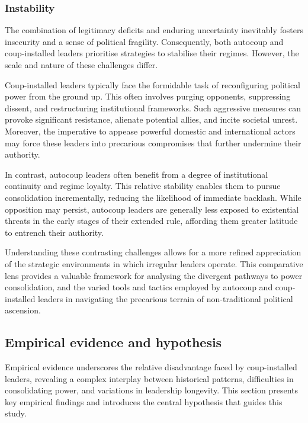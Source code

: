 \documentclass[
  12pt,
]{report}
\begin{document}
\subsubsection*{Instability}\label{instability}

The combination of legitimacy deficits and enduring uncertainty
inevitably fosters insecurity and a sense of political fragility.
Consequently, both autocoup and coup-installed leaders prioritise
strategies to stabilise their regimes. However, the scale and nature of
these challenges differ.

Coup-installed leaders typically face the formidable task of
reconfiguring political power from the ground up. This often involves
purging opponents, suppressing dissent, and restructuring institutional
frameworks. Such aggressive measures can provoke significant resistance,
alienate potential allies, and incite societal unrest. Moreover, the
imperative to appease powerful domestic and international actors may
force these leaders into precarious compromises that further undermine
their authority.

In contrast, autocoup leaders often benefit from a degree of
institutional continuity and regime loyalty. This relative stability
enables them to pursue consolidation incrementally, reducing the
likelihood of immediate backlash. While opposition may persist, autocoup
leaders are generally less exposed to existential threats in the early
stages of their extended rule, affording them greater latitude to
entrench their authority.

Understanding these contrasting challenges allows for a more refined
appreciation of the strategic environments in which irregular leaders
operate. This comparative lens provides a valuable framework for
analysing the divergent pathways to power consolidation, and the varied
tools and tactics employed by autocoup and coup-installed leaders in
navigating the precarious terrain of non-traditional political
ascension.

\subsection*{Empirical evidence and
hypothesis}\label{empirical-evidence-and-hypothesis}

Empirical evidence underscores the relative disadvantage faced by
coup-installed leaders, revealing a complex interplay between historical
patterns, difficulties in consolidating power, and variations in
leadership longevity. This section presents key empirical findings and
introduces the central hypothesis that guides this study.
\end{document}
